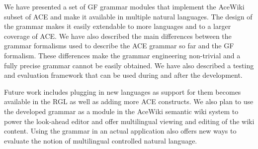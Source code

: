 \documentclass[a4paper]{article}
\begin{document}
We have presented a set of GF grammar modules that implement the AceWiki
subset of ACE and make it available in multiple natural languages. The design
of the grammar makes it easily extendable to more languages and to a larger
coverage of ACE.
We have also described the main differences between the grammar formalisms
used to describe the ACE grammar so far and the GF formalism.
These differences make the grammar engineering non-trivial and a fully
precise grammar cannot be easily obtained.
We have also described a testing and evaluation framework that can be used
during and after the development.

Future work includes plugging in new languages as support for them becomes
available in the RGL as well as adding more ACE constructs. We also plan
to use the developed grammar as a module in the AceWiki semantic wiki system
to power the look-ahead editor and offer multilingual viewing and editing
of the wiki content. Using the grammar in an actual application also offers
new ways to evaluate the notion of multilingual controlled natural language.



%
\end{document}
